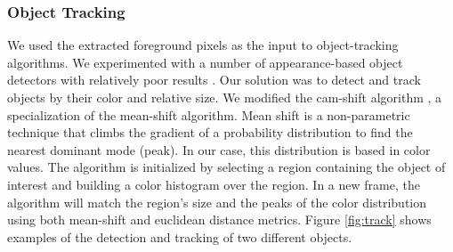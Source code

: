 \documentclass[10pt,letterpaper]{article}
\begin{document}

\subsubsection{Object Tracking}

We used the extracted foreground pixels as the input to object-tracking algorithms. 
We experimented with a number of appearance-based object detectors with relatively poor results \cite{kalal2012}. Our solution was to detect and track objects by their color and relative size. We modified the cam-shift algorithm \cite{bradski1998b}, a specialization of the mean-shift algorithm.
Mean shift is a non-parametric technique that climbs the gradient of a probability distribution to find the nearest dominant mode (peak). In our case, this distribution is based in color values. The algorithm is initialized by selecting a region containing the object of interest and building a color histogram over the region. In a new frame, the algorithm will match the region's size and the peaks of the color distribution using both mean-shift and euclidean distance metrics. Figure \ref{fig:track} shows examples of the detection and tracking of two different objects.
\end{document}
